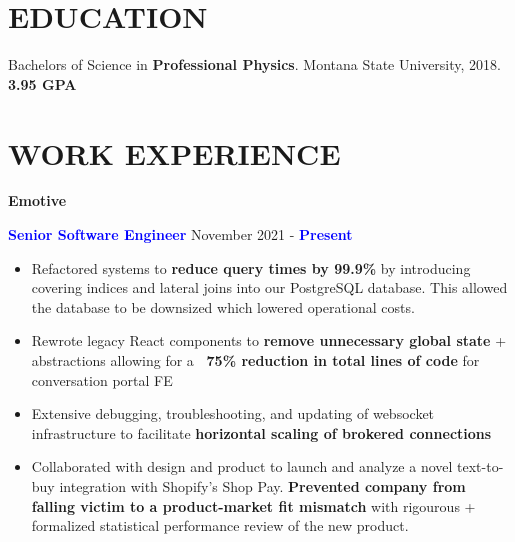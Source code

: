 \documentclass[11pt]{resume}
\begin{document}
    \vspace{-1em}
    \noindent\begin{minipage}[t]{1\textwidth}
      {\section* {\large{EDUCATION}}}
      Bachelors of Science in {\bf Professional Physics}. Montana State University,
      2018.
      {\bf 3.95 GPA}

      {\section* {\large{WORK EXPERIENCE}}}
      {\bf Emotive}
      \vspace{.25em}
      \begin{addmargin}[.5em]{0em}
        {\bf \textcolor{blue}{Senior Software Engineer}} {\hfill November 2021 - {\bf \textcolor{blue}{Present}}}
        \vspace{-.5em}
        \begin{itemize}
            \setlength\itemsep{-.2em}

            \item {Refactored systems to {\bf reduce query times by
              99.9\%} by introducing covering indices and lateral joins into
              our PostgreSQL database. This allowed the database to be downsized which
              lowered operational costs.}

            \item {Rewrote legacy React components to {\bf remove unnecessary global
                  state} + abstractions allowing for a {\bf ~75\% reduction in total
                  lines of code} for conversation portal FE}
            \item {Extensive debugging, troubleshooting, and updating of
                  websocket infrastructure to facilitate {\bf horizontal scaling of
                  brokered connections}}
            \item {Collaborated with design and product to launch and analyze a
              novel text-to-buy integration with Shopify's Shop Pay. {\bf Prevented
                  company from falling victim to a product-market fit mismatch} with
                  rigourous + formalized statistical performance review of the new
                  product.}


\end{itemize}
\end{addmargin}
\end{minipage}
\end{document}
